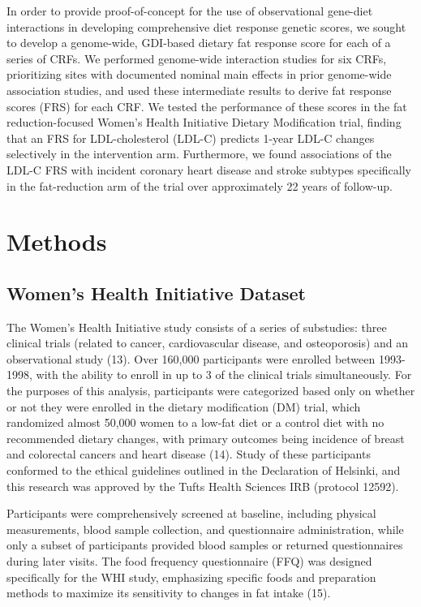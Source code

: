 \documentclass[]{article}
\begin{document}
In order to provide proof-of-concept for the use of observational
gene-diet interactions in developing comprehensive diet response genetic
scores, we sought to develop a genome-wide, GDI-based dietary fat
response score for each of a series of CRFs. We performed genome-wide
interaction studies for six CRFs, prioritizing sites with documented
nominal main effects in prior genome-wide association studies, and used
these intermediate results to derive fat response scores (FRS) for each
CRF. We tested the performance of these scores in the fat
reduction-focused Women's Health Initiative Dietary Modification trial,
finding that an FRS for LDL-cholesterol (LDL-C) predicts 1-year LDL-C
changes selectively in the intervention arm. Furthermore, we found
associations of the LDL-C FRS with incident coronary heart disease and
stroke subtypes specifically in the fat-reduction arm of the trial over
approximately 22 years of follow-up.

\hypertarget{methods}{%
\section{Methods}\label{methods}}

\hypertarget{womens-health-initiative-dataset}{%
\subsection{Women's Health Initiative
Dataset}\label{womens-health-initiative-dataset}}

The Women's Health Initiative study consists of a series of substudies:
three clinical trials (related to cancer, cardiovascular disease, and
osteoporosis) and an observational study (13). Over 160,000 participants
were enrolled between 1993-1998, with the ability to enroll in up to 3
of the clinical trials simultaneously. For the purposes of this
analysis, participants were categorized based only on whether or not
they were enrolled in the dietary modification (DM) trial, which
randomized almost 50,000 women to a low-fat diet or a control diet with
no recommended dietary changes, with primary outcomes being incidence of
breast and colorectal cancers and heart disease (14). Study of these
participants conformed to the ethical guidelines outlined in the
Declaration of Helsinki, and this research was approved by the Tufts
Health Sciences IRB (protocol 12592).

Participants were comprehensively screened at baseline, including
physical measurements, blood sample collection, and questionnaire
administration, while only a subset of participants provided blood
samples or returned questionnaires during later visits. The food
frequency questionnaire (FFQ) was designed specifically for the WHI
study, emphasizing specific foods and preparation methods to maximize
its sensitivity to changes in fat intake (15).
\end{document}
